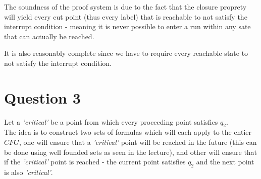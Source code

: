 \documentclass{article}
\begin{document}
The soundness of the proof system is due to the fact that the closure proprety
will yield every cut point (thus every label) that is reachable to not satisfy the
interrupt condition - meaning it is never possible to enter a run within any sate that can actually be reached.

It is also reasonably complete since we have to require
every reachable state to not satisfy the interrupt condition.


\section*{Question 3}
Let a \emph{'critical'} be a point from which every proceeding point satisfies $q_2$.\\

The idea is to construct two sets of formulas which will each apply to the entier $CFG$,
one will ensure that a \emph{'critical'} point will be reached in the future (this can be done
using well founded sets as seen in the lecture),
and other will ensure that if the \emph{'critical'} point is reached -
the current point satisfies $q_2$ and the next point is also \emph{'critical'}.
\end{document}
